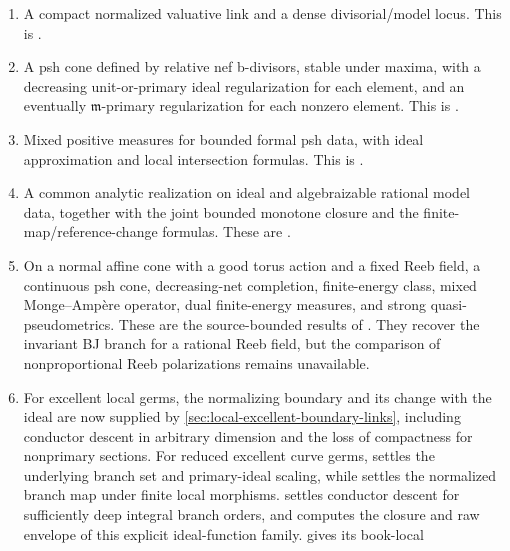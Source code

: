 \begin{enumerate}
\item A compact normalized valuative link and a dense divisorial/model locus.
      This is .
\item A psh cone defined by relative nef b-divisors, stable under maxima,
      with a decreasing unit-or-primary ideal regularization for each
      element, and an eventually $\mathfrak m$-primary regularization for
      each nonzero element.  This is
      .
\item Mixed positive measures for bounded formal psh data, with ideal
      approximation and local intersection formulas.  This is
      .
\item A common analytic realization on ideal and algebraizable rational
      model data, together with the joint bounded monotone closure and the
      finite-map/reference-change formulas. These are
      .
\item On a normal affine cone with a good torus action and a fixed Reeb
      field, a continuous psh cone, decreasing-net completion, finite-energy
      class, mixed Monge--Amp\`ere operator, dual finite-energy measures, and
      strong quasi-pseudometrics.  These are the source-bounded results of
      .  They recover the invariant BJ
      branch for a rational Reeb field, but the comparison of nonproportional Reeb
      polarizations remains unavailable.
\item For excellent local germs, the normalizing boundary and its change
      with the ideal are now supplied by
      \cref{sec:local-excellent-boundary-links}, including conductor
      descent in arbitrary dimension and the loss of compactness for
      nonprimary sections. For reduced excellent curve germs, 
      settles the underlying branch set and primary-ideal scaling, while
       settles the normalized
      branch map under finite local morphisms.
       settles
      conductor descent for sufficiently deep integral branch orders, and
       computes the closure and
      raw envelope of this explicit ideal-function family.
       gives its book-local

\end{enumerate}
